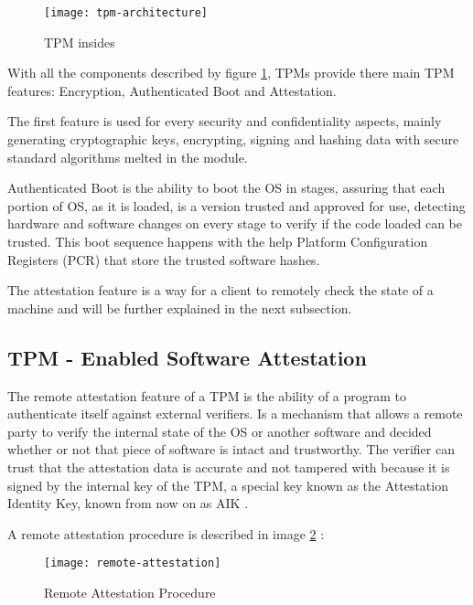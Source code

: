 \begin{figure}[htbp]
	\centering
	{\texttt{[image: tpm-architecture]}}%
	\caption{TPM insides}
	\label{fig:tpm_architecture}
\end{figure}


With all the components described by figure \ref{fig:tpm_architecture}, \glspl{TPM} provide there main \gls{TPM} features: Encryption, Authenticated Boot and Attestation. 

The first feature is used for every security and confidentiality aspects, mainly generating cryptographic keys, encrypting, signing and hashing data with secure standard algorithms melted in the module.

Authenticated Boot is the ability to boot the \gls{OS} in stages, assuring that each portion of OS, as it is loaded, is a version trusted and approved for use, detecting hardware and software changes on every stage to verify if the code loaded can be trusted. This boot sequence happens with the help Platform Configuration Registers (\gls{PCR}) that store the trusted software hashes.

The attestation feature is a way for a client to remotely check the state of a machine and will be further explained in the next subsection.


\subsection{TPM - Enabled Software Attestation} %
\label{ssec:enabled_software_attestation}

The remote attestation feature of a \gls{TPM} is the ability of a program to authenticate itself against external verifiers. Is a mechanism that allows a remote party to verify the internal state of the OS or another software and decided whether or not that piece of software is intact and trustworthy. The verifier can trust that the attestation data is accurate and not tampered with because it is signed by the internal key of the \gls{TPM}, a special key known as the Attestation Identity Key, known from now on as \gls{AIK} \cite{attestation:aik}.

A remote attestation procedure is described in image \ref{fig:remote-attestation} \cite{attestation:1}: 

\begin{figure}[htbp]
	\centering
	{\texttt{[image: remote-attestation]}}%
	\caption{Remote Attestation Procedure}
	\label{fig:remote-attestation}
\end{figure}

